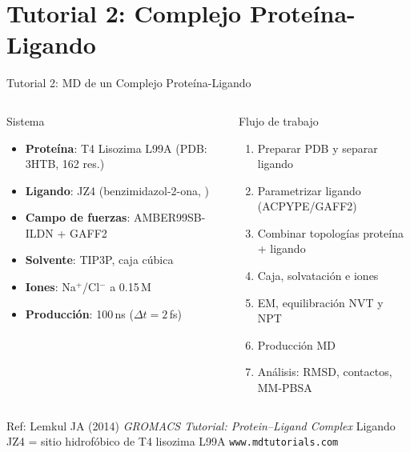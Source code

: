 \documentclass[aspectratio=169, 10pt]{beamer}
\begin{document}
\section{Tutorial 2: Complejo Proteína-Ligando}

\begin{frame}{Tutorial 2: MD de un Complejo Proteína-Ligando}
\begin{columns}[T]
\begin{block}{Sistema}
  \begin{itemize}\small
    \item \textbf{Proteína}: T4 Lisozima L99A (PDB: 3HTB, 162 res.)
    \item \textbf{Ligando}: JZ4 (benzimidazol-2-ona, )
    \item \textbf{Campo de fuerzas}: AMBER99SB-ILDN + GAFF2
    \item \textbf{Solvente}: TIP3P, caja cúbica
    \item \textbf{Iones}: Na$^+$/Cl$^-$ a 0.15\,M
    \item \textbf{Producción}: 100\,ns ($\Delta t = 2$\,fs)
  \end{itemize}
\end{block}
\begin{block}{Flujo de trabajo}
  \begin{enumerate}\small
    \item[\textbf{1.}] Preparar PDB y separar ligando
    \item[\textbf{2.}] Parametrizar ligando (ACPYPE/GAFF2)
    \item[\textbf{3.}] Combinar topologías proteína + ligando
    \item[\textbf{4.}] Caja, solvatación e iones
    \item[\textbf{5.}] EM, equilibración NVT y NPT
    \item[\textbf{6.}] Producción MD
    \item[\textbf{7.}] Análisis: RMSD, contactos, MM-PBSA
  \end{enumerate}
\end{block}
\end{columns}
\vspace{0.3em}
\begin{tcolorbox}[comparisonbox]
\centering\small
Ref: Lemkul JA (2014) \textit{GROMACS Tutorial: Protein--Ligand Complex} \quad
Ligando JZ4 = sitio hidrofóbico de T4 lisozima L99A \quad \texttt{www.mdtutorials.com}
\end{tcolorbox}
\end{frame}
\end{document}
